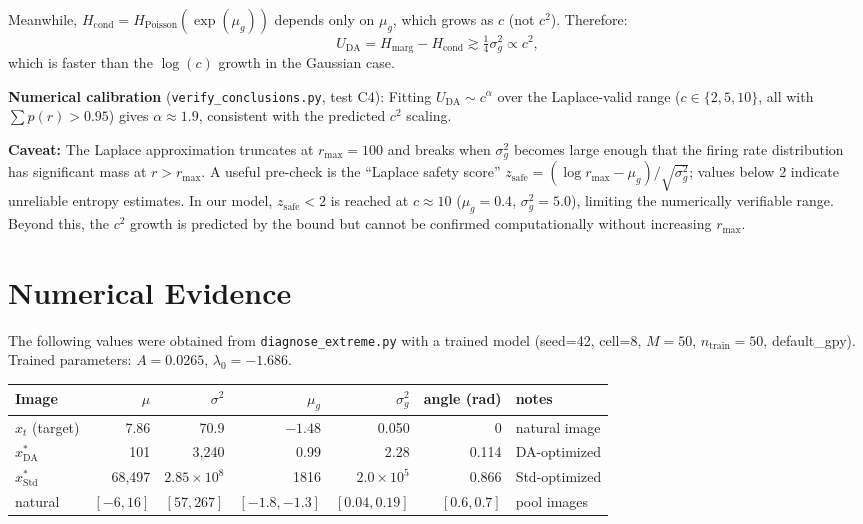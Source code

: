 \documentclass[11pt]{article}
\begin{document}
Meanwhile, $H_{\text{cond}} = H_{\text{Poisson}}(\exp(\mu_g))$ depends only on $\mu_g$,
which grows as $c$ (not $c^2$). Therefore:
\[
    U_{\text{DA}} = H_{\text{marg}} - H_{\text{cond}} \gtrsim \tfrac{1}{4}\sigma^2_g \propto c^2,
\]
which is faster than the $\log(c)$ growth in the Gaussian case.

\textbf{Numerical calibration} (\texttt{verify\_conclusions.py}, test C4):
Fitting $U_{\text{DA}} \sim c^\alpha$ over the Laplace-valid range
($c \in \{2, 5, 10\}$, all with $\sum p(r) > 0.95$) gives
$\alpha \approx 1.9$, consistent with the predicted $c^2$ scaling.

\textbf{Caveat:} The Laplace approximation truncates at $r_{\max} = 100$
and breaks when $\sigma^2_g$ becomes large enough that the firing rate
distribution has significant mass at $r > r_{\max}$.
A useful pre-check is the ``Laplace safety score''
$z_{\text{safe}} = (\log r_{\max} - \mu_g)/\sqrt{\sigma^2_g}$;
values below 2 indicate unreliable entropy estimates.
In our model, $z_{\text{safe}} < 2$ is reached at $c \approx 10$
($\mu_g = 0.4$, $\sigma^2_g = 5.0$), limiting the numerically
verifiable range.  Beyond this, the $c^2$ growth is predicted
by the bound but cannot be confirmed computationally without
increasing $r_{\max}$.

\section{Numerical Evidence}

The following values were obtained from \texttt{diagnose\_extreme.py} with
a trained model (seed=42, cell=8, $M=50$, $n_{\text{train}}=50$, default\_gpy).
Trained parameters: $A = 0.0265$, $\lambda_0 = -1.686$.

\begin{center}
\begin{tabular}{lrrrrrl}
\hline
Image & $\mu$ & $\sigma^2$ & $\mu_g$ & $\sigma^2_g$ & angle (rad) & notes \\
\hline
$x_t$ (target) & 7.86 & 70.9 & $-1.48$ & 0.050 & 0 & natural image \\
$x^*_{\text{DA}}$ & 101 & 3{,}240 & 0.99 & 2.28 & 0.114 & DA-optimized \\
$x^*_{\text{Std}}$ & 68{,}497 & $2.85 \times 10^8$ & 1816 & $2.0 \times 10^5$ & 0.866 & Std-optimized \\
natural & $[-6, 16]$ & $[57, 267]$ & $[-1.8, -1.3]$ & $[0.04, 0.19]$ & $[0.6, 0.7]$ & pool images \\
\hline
\end{tabular}
\end{center}
\end{document}
